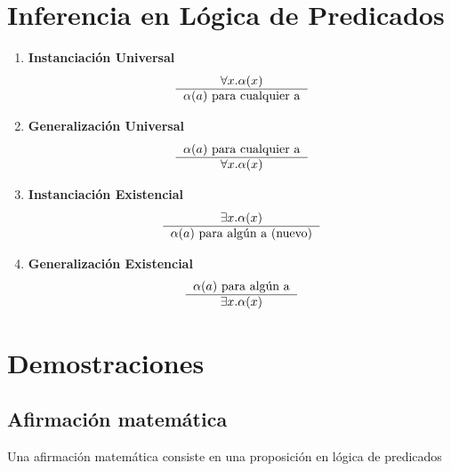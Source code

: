 \documentclass[../main.tex]{subfiles}
\begin{document}
\section{Inferencia en Lógica de Predicados}
\begin{enumerate}
    \item \textbf{Instanciación Universal}
    \[
        \begin{tabular}{c}
        $\forall{} x . \alpha{} (x)$ \\ \hline
        $\alpha{} (a)$ para cualquier a
        \end{tabular}
    \]
    \item \textbf{Generalización Universal}
    \[
        \begin{tabular}{c}
            $\alpha{} (a)$ para cualquier a \\ \hline
            $\forall{} x . \alpha{} (x)$
        \end{tabular}
    \]
    \item \textbf{Instanciación Existencial}
    \[
        \begin{tabular}{c}
        $\exists{} x . \alpha{} (x)$ \\ \hline
        $\alpha{} (a)$ para algún a (nuevo)
        \end{tabular}
    \]
    \item \textbf{Generalización Existencial}
    \[
        \begin{tabular}{c}
        $\alpha{} (a)$ para algún a\\ \hline
        $\exists{} x . \alpha{} (x)$
        \end{tabular}
    \]

\end{enumerate}


\section{Demostraciones}
\subsection{Afirmación matemática}
Una afirmación matemática consiste en una proposición en lógica de predicados
\end{document}
